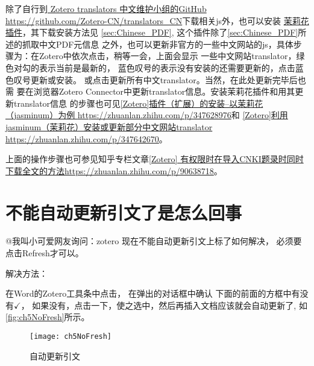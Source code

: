 \documentclass[cn,11pt,chinese]{elegantbook}
\begin{document}
				除了自行到\href{https://github.com/Zotero-CN/translators_CN}{ Zotero translators 
				中文维护小组的GitHub 
				\url{ https://github.com/Zotero-CN/translators_CN}}下载相关js外，也可以安装
				\href{https://github.com/l0o0/jasminum/releases}{茉莉花插件}，其下载安装方法见
				\cref{sec:Chinese_PDF}, 这个插件除了\cref{sec:Chinese_PDF}所述的抓取中文PDF元信息
				之外，也可以更新非官方的一些中文网站的js，具体步骤为：在Zotero中依次点击，稍等一会，上面会显示
				一些中文网站translator，绿色对勾的表示当前是最新的，
				蓝色叹号的表示没有安装的还需要更新的，点击蓝色叹号更新或安装。
				或点击更新所有中文translator。当然，在此处更新完毕后也需
				要在浏览器Zotero Connector中更新translator信息。安装茉莉花插件和用其更新translator信息
				的步骤也可见\href{https://zhuanlan.zhihu.com/p/347628976}
				{[Zotero]插件（扩展）的安装--以茉莉花（jasminum）为例
				\url{https://zhuanlan.zhihu.com/p/347628976}}和
				\href{https://zhuanlan.zhihu.com/p/347642670}
				{[Zotero]利用jasminum（茉莉花）安装或更新部分中文网站translator
				\url{https://zhuanlan.zhihu.com/p/347642670}}。


			上面的操作步骤也可参见知乎专栏文章\href{https://zhuanlan.zhihu.com/p/90638718}{[Zotero]
			有权限时在导入CNKI题录时同时下载全文的方法\url{https://zhuanlan.zhihu.com/p/90638718}}。

		\section{不能自动更新引文了是怎么回事}\label{sec:norefresh}
			@我叫小可爱网友询问：zotero 现在不能自动更新引文上标了如何解决，
			必须要点击Refresh才可以。
			
			解决方法：

			在Word的Zotero工具条中点击，
			在弹出的对话框中确认
			下面的前面的方框中有没有$\checkmark$，
			如果没有，点击一下，使之选中，然后再插入文档应该就会自动更新了,
			如\autoref{fig:ch5NoFresh}所示。
				\begin{figure}[htbp]
					\centering
					\texttt{[image: ch5NoFresh]}
					\caption{自动更新引文}
					\label{fig:ch5NoFresh}
				\end{figure}
\end{document}
